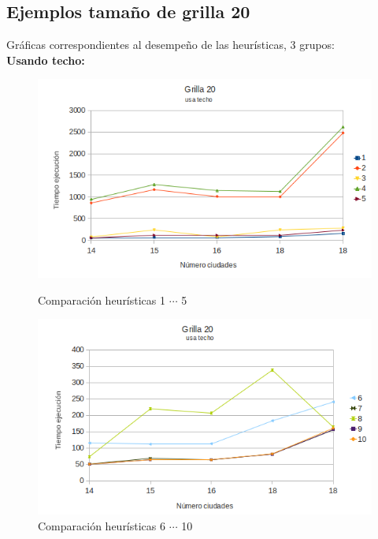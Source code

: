 \documentclass[10pt]{article}
\begin{document}


\newpage
\subsection{Ejemplos tamaño de grilla 20}

Gráficas correspondientes al desempeño de las heurísticas, 3 grupos:\\
\textbf{Usando techo:}


\begin{figure}[ht]
\begin{minipage}[b]{0.45\linewidth}
 \centering
 \includegraphics[width=\textwidth]{grilla20ceil0.png}
 \caption{Comparación heurísticas  1 $\cdots$ 5}
 \label{fig:grid20ceil0}
\end{minipage}
\hspace{0.5cm}
\begin{minipage}[b]{0.45\linewidth}
 
\centering
 \includegraphics[width=\textwidth]{grilla20ceil1.png}
 \caption{Comparación heurísticas  6 $\cdots$ 10}
 \label{fig:grid20ceil1}
\end{minipage}


\end{figure}
\end{document}

